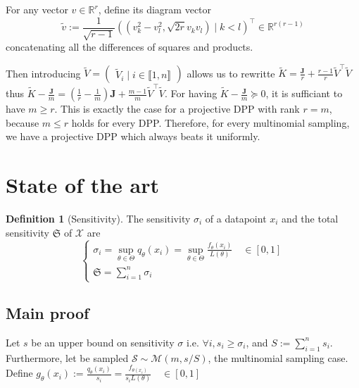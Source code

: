 \documentclass{article} %
\newcommand{\RR}{\mathbb{R}}
\newcommand{\T}{^\top}  %
\newcommand{\1}{\mathds{1}} %
\newcommand{\moones}{\boldsymbol{J}} %
\newcommand{\intint}[2]{\llbracket #1,#2 \rrbracket} %
\theoremstyle{definition} %
\newtheorem{definition}{Definition}[section]
\begin{document}
For any vector $v \in \RR^{r}$, \cite{copenhaver2013diagramvectors} define its diagram vector 
$$\tilde v :=
 \frac{1}{\sqrt{r-1}} ((v_k^{2}-v_l^{2} , \sqrt{2 r} v_k v_l ) \mid k<l)\T \in \RR^{r(r-1)}$$
concatenating all the differences of squares and products.

Then introducing $\tilde V = \begin{pmatrix}\tilde V_i \mid i\in\intint{1}{n}\end{pmatrix}
$ allows us to rewritte $\tilde K = \frac{\moones}{r} + \frac{r-1}{r} \tilde V\T \tilde V$ thus $\tilde K - \frac{\moones}{m} = (\frac{1}{r}-\frac{1}{m})\moones + \frac{m-1}{m} \tilde V\T \tilde V$. For having $\tilde K - \frac{\moones}{m}\succeq 0$, it is sufficiant to have $m \geq r$. This is exactly the case for a projective DPP with rank $r = m$, because $m \leq r$ holds for every DPP. Therefore, for every multinomial sampling, we have a projective DPP which always beats it uniformly.


\section{State of the art}
\begin{definition}[Sensitivity]
	The sensitivity $\sigma_i$ of a datapoint $x_{i}$ and the total sensitivity $\mathfrak S$ of $\mathcal X$ are
	$$
	\begin{cases}
		\sigma_{i}=\sup_{\theta \in \Theta} q_{\theta}(x_i) = \sup _{\theta \in \Theta} \frac{f_{\theta}\left(x_{i}\right)}{L(\theta)} \quad \in[0,1]\\
		\mathfrak{S}=\sum_{i=1}^{n} \sigma_{i}
	\end{cases}
	$$
\end{definition} 

\subsection{Main proof}
Let $s$ be an upper bound on sensitivity $\sigma$ i.e. $\forall i, s_i \geq \sigma_i$, and $S := \sum_{i=1}^n s_i$. Furthermore, let be sampled  $\mathcal S \sim \mathcal M(m, s/S)$, the multinomial sampling case. Define $g_\theta(x_i) := \frac{q_\theta(x_i)}{s_i} = \frac{f_{\theta(x_i)}}{s_i L(\theta)}  \quad \in[0,1]$
\end{document}
